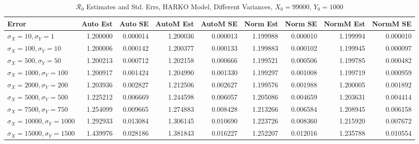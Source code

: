 \documentclass[12pt]{article}
\newcommand{\rr}{\ensuremath{\mathcal{R}_0}}
\begin{document}
\begin{table}[H]
	
	\caption{$\rr$ Estimates and Std. Errs, HARKO Model, 
		Different Variances, $X_0 = 99000$, $Y_0 = 1000$}
	\begin{footnotesize}
		\hskip -1.7cm
		\begin{tabular}{l|r|r|r|r|r|r|r|r}
			\hline
			Error & Auto Est & Auto SE & AutoM Est & AutoM SE & Norm Est & Norm SE & NormM Est & NormM SE\\
			\hline
			$\sigma_X = 10, \sigma_Y = 1$ & 1.200000 & 0.000014 & 1.200036 & 0.000013 & 1.199988 & 0.000010 & 1.199994 & 0.000010\\
			\hline
			$\sigma_X = 100, \sigma_Y = 10$ & 1.200006 & 0.000142 & 1.200377 & 0.000133 & 1.199883 & 0.000102 & 1.199945 & 0.000097\\
			\hline
			$\sigma_X = 500, \sigma_Y = 50$ & 1.200213 & 0.000712 & 1.202158 & 0.000666 & 1.199521 & 0.000506 & 1.199785 & 0.000482\\
			\hline
			$\sigma_X = 1000, \sigma_Y = 100$ & 1.200917 & 0.001424 & 1.204990 & 0.001330 & 1.199297 & 0.001008 & 1.199719 & 0.000959\\
			\hline
			$\sigma_X = 2000, \sigma_Y = 200$ & 1.203936 & 0.002827 & 1.212506 & 0.002627 & 1.199576 & 0.001988 & 1.200005 & 0.001892\\
			\hline
			$\sigma_X = 5000, \sigma_Y = 500$ & 1.225212 & 0.006669 & 1.244598 & 0.006057 & 1.205086 & 0.004659 & 1.203631 & 0.004414\\
			\hline
			$\sigma_X = 7500, \sigma_Y = 750$ & 1.254099 & 0.009665 & 1.274883 & 0.008428 & 1.213266 & 0.006584 & 1.208945 & 0.006158\\
			\hline
			$\sigma_X = 10000, \sigma_Y = 1000$ & 1.292933 & 0.013084 & 1.306145 & 0.010690 & 1.223726 & 0.008360 & 1.215920 & 0.007672\\
			\hline
			$\sigma_X = 15000, \sigma_Y = 1500$ & 1.439976 & 0.028186 & 1.381843 & 0.016227 & 1.252207 & 0.012016 & 1.235788 & 0.010554\\
			\hline
		\end{tabular}
	\end{footnotesize}
\end{table}
\end{document}
